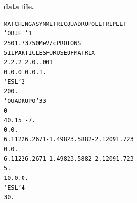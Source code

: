 \begin{center}
\noindent \textbf{ \zgoubi data file.}
\begin{tiny}
\begin{alltt}
                                                MATCHING A SYMMETRIC QUADRUPOLE TRIPLET                          
                                                'OBJET'                                                                1      
                                                2501.73                        750MeV/c PROTONS                               
                                                5                              11 PARTICLES FOR USE OF MATRIX                 
                                                2.  2.  2.   2.  0. .001                                                      
                                                0.  0.  0.   0.  0.  1.                                                       
                                                'ESL   '                                                               2      
                                                200.                                                                          
                                                'QUADRUPO'    3                                                        3      
                                                 0                                                                            
                                                40.  15.  -7.                                                                 
                                                0.  0.                                                                        
                                                6  .1122 6.2671 -1.4982 3.5882 -2.1209 1.723                                  
                                                0.   0.                                                                       
                                                6  .1122 6.2671 -1.4982 3.5882 -2.1209 1.723                                  
                                                5.                                                                            
                                                1 0. 0. 0.                                                                    
                                                'ESL'                                                                  4      
                                                30.                                                                           

\end{alltt}
\end{tiny}
\end{center}
